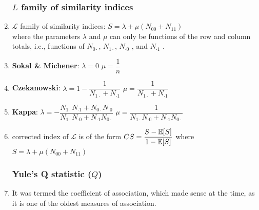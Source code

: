 \begin{enumerate}
\subsubsection{$L$ family of similarity indices}

    \item $\mathcal{L}$ family of similarity indices: $ S = \lambda + \mu(N_{00} + N_{11}) $
    \hfill \cite{statistics/book/Statistics-for-Data-Scientists/Maurits-Kaptein}
    \\
    where the parameters $\lambda$ and $\mu$ can only be functions of the row and column totals, i.e., functions of $N_{0\cdot }$, $N_{1\cdot }$, $N_{\cdot 0}$ , and $N_{\cdot 1}$ .
    \hfill \cite{statistics/book/Statistics-for-Data-Scientists/Maurits-Kaptein}

    \item \textbf{Sokal \& Michener}:
    \hfill
    $ \lambda = 0 $
    \hfill
    $ \mu = \dfrac{1}{n} $
    \hfill \cite{statistics/book/Statistics-for-Data-Scientists/Maurits-Kaptein}

    \item \textbf{Czekanowski}:
    \hfill
    $ \lambda = 1 - \dfrac{1}{N_{1\cdot} + N_{\cdot 1}} $
    \hfill
    $ \mu = \dfrac{1}{N_{1\cdot} + N_{\cdot 1}} $
    \hfill \cite{statistics/book/Statistics-for-Data-Scientists/Maurits-Kaptein}

    \item \textbf{Kappa}:
    \hfill
    $ \lambda = - \dfrac{N_{1\cdot} N_{\cdot 1} + N_{0\cdot} N_{\cdot 0}}{N_{1\cdot} N_{\cdot 0} + N_{\cdot 1} N_{0\cdot}} $
    \hfill
    $ \mu = \dfrac{1}{N_{1\cdot} N_{\cdot 0} + N_{\cdot 1} N_{0\cdot}} $
    \hfill \cite{statistics/book/Statistics-for-Data-Scientists/Maurits-Kaptein}

    \item corrected index of $\mathcal{L}$ is of the form
    $ C S = \dfrac{S - \mathbb{E}[S]}{1 - \mathbb{E}[S]} $
    where $ S = \lambda + \mu(N_{00} + N_{11}) $
    \hfill \cite{statistics/book/Statistics-for-Data-Scientists/Maurits-Kaptein}


\subsubsection{Yule’s Q statistic ($Q$)}

    \item It was termed the coefficient of association, which made sense at the time, as it is one of the oldest measures of association.
    \hfill \cite{statistics/book/Statistics-for-Data-Scientists/Maurits-Kaptein}


\end{enumerate}
